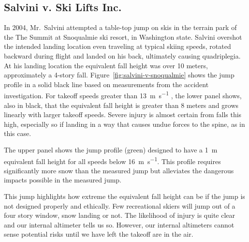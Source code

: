 \documentclass{article}
\begin{document}
\subsection{Salvini v. Ski Lifts Inc.}
%
In 2004, Mr.~Salvini attempted a table-top jump on skis in the terrain park of
the The Summit at Snoqualmie ski resort, in Washington state.  Salvini overshot
the intended landing location even traveling at typical skiing speeds,
rotated backward during flight and landed on his back, ultimately causing
quadriplegia. At his landing location the equivalent fall height was over 10
meters, approximately a 4-story fall.  Figure~\ref{fig:salvini-v-snoqualmie}
shows the jump profile in a solid black line based on measurements from the
accident investigation.  For takeoff speeds greater than
13~\si{\meter\per\second}
, the lower panel
shows, also in black, that the equivalent fall height is greater than 8 meters
and grows linearly with larger takeoff speeds. Severe injury is almost certain
from falls this high, especially so if landing in a way that causes undue
forces to the spine, as in this case.

The upper panel shows the jump profile (green) designed to have a
1~\si{\meter} equivalent fall height for all speeds below
16~\si{\meter\per\second}. This profile requires significantly more snow than
the measured jump but alleviates the dangerous impacts possible in the measured
jump.

This jump highlights how extreme the equivalent fall height can be if the jump
is not designed properly and ethically. Few recreational skiers will jump out
of a four story window, snow landing or not. The likelihood of injury is quite
clear and our internal altimeter tells us so. However, our internal altimeters
cannot sense potential risks until we have left the takeoff are in the air.
%
\end{document}
